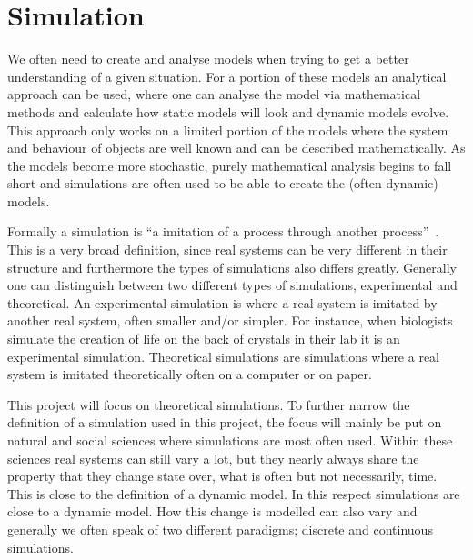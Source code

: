 \section{Simulation}
We often need to create and analyse models when trying to get a better understanding of a given situation. For a portion of these models an analytical approach can be used, where one can analyse the model via mathematical methods and calculate how static models will look and dynamic models evolve. This approach only works on a limited portion of the models where the system and behaviour of objects are well known and can be described mathematically. As the models become more stochastic, purely mathematical analysis begins to fall short and simulations are often used to be able to create the (often dynamic) models.

Formally a simulation is \enquote{a imitation of a process through another process}~\cite{hegselmann1996modelling}. This is a very broad definition, since real systems can be very different in their structure and furthermore the types of simulations also differs greatly. Generally one can distinguish between two different types of simulations, experimental and theoretical. An experimental simulation is where a real system is imitated by another real system, often smaller and/or simpler. For instance, when biologists simulate the creation of life on the back of crystals in their lab it is an experimental simulation. Theoretical simulations are simulations where a real system is imitated theoretically often on a computer or on paper. 

This project will focus on theoretical simulations. To further narrow the definition of a simulation used in this project, the focus will mainly be put on natural and social sciences where simulations are most often used. Within these sciences real systems can still vary a lot, but they nearly always share the property that they change state over, what is often but not necessarily, time. This is close to the definition of a dynamic model. In this respect simulations are close to a dynamic model. How this change is modelled can also vary and generally we often speak of two different paradigms; discrete and continuous simulations.

